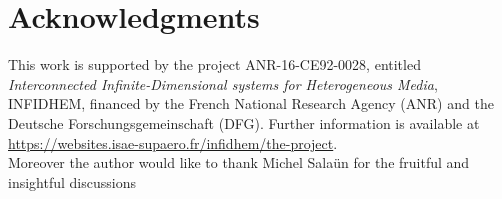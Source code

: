 \documentclass[preprint,12pt]{elsarticle}
\begin{document}
\section*{Acknowledgments}
This work is supported by the project ANR-16-CE92-0028,
entitled {\em Interconnected Infinite-Dimensional systems for Heterogeneous
Media}, INFIDHEM, financed by the French National Research Agency (ANR) and the Deutsche Forschungsgemeinschaft (DFG). Further information is available at {\url{https://websites.isae-supaero.fr/infidhem/the-project}}. \\
Moreover the author would like to thank Michel Sala\"un for the fruitful and insightful discussions


 
\end{document}
